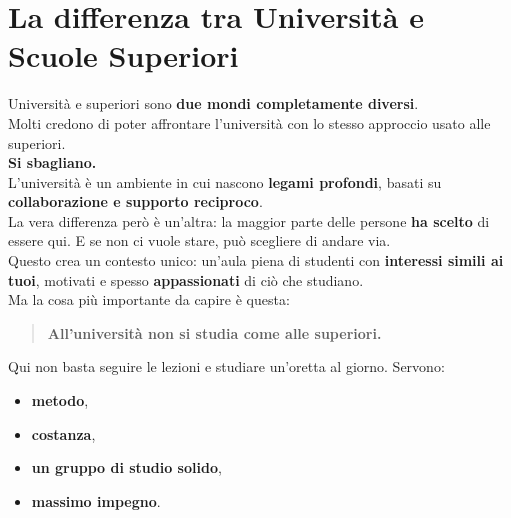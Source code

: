 \documentclass[18pt]{extarticle}
\begin{document}
\section{La differenza tra Università e Scuole Superiori}
Università e superiori sono \textbf{due mondi completamente diversi}.\\
Molti credono di poter affrontare l'università con lo stesso approccio usato alle superiori.\\
\textbf{Si sbagliano.}\\
L'università è un ambiente in cui nascono \textbf{legami profondi}, basati su \textbf{collaborazione e supporto reciproco}.\\
La vera differenza però è un'altra: la maggior parte delle persone \textbf{ha scelto} di essere qui. E se non ci vuole stare, può scegliere di andare via.\\
Questo crea un contesto unico: un'aula piena di studenti con \textbf{interessi simili ai tuoi}, motivati e spesso \textbf{appassionati} di ciò che studiano.\\
Ma la cosa più importante da capire è questa:
\begin{quote}
\textbf{All'università non si studia come alle superiori.}
\end{quote}%
Qui non basta seguire le lezioni e studiare un'oretta al giorno. Servono:
\begin{itemize}
\item \textbf{metodo},
\item \textbf{costanza},
\item \textbf{un gruppo di studio solido},
\item \textbf{massimo impegno}.
\end{itemize}
\end{document}
